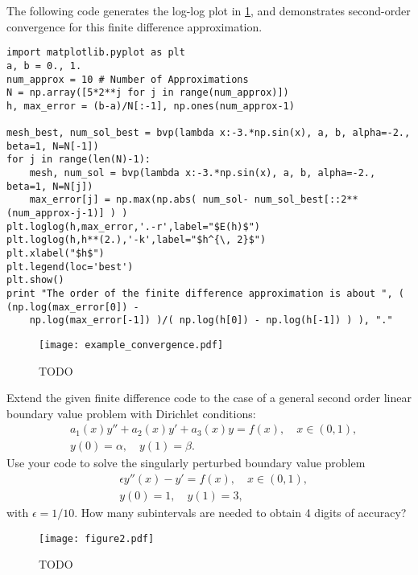 The following code generates the log-log plot in \ref{figure1}, and demonstrates second-order convergence for this finite difference approximation. 
\begin{lstlisting}
import matplotlib.pyplot as plt
a, b = 0., 1.
num_approx = 10 # Number of Approximations
N = np.array([5*2**j for j in range(num_approx)])
h, max_error = (b-a)/N[:-1], np.ones(num_approx-1)

mesh_best, num_sol_best = bvp(lambda x:-3.*np.sin(x), a, b, alpha=-2., beta=1, N=N[-1])
for j in range(len(N)-1): 
    mesh, num_sol = bvp(lambda x:-3.*np.sin(x), a, b, alpha=-2., beta=1, N=N[j])
    max_error[j] = np.max(np.abs( num_sol- num_sol_best[::2**(num_approx-j-1)] ) )
plt.loglog(h,max_error,'.-r',label="$E(h)$")
plt.loglog(h,h**(2.),'-k',label="$h^{\, 2}$")
plt.xlabel("$h$")
plt.legend(loc='best')
plt.show()
print "The order of the finite difference approximation is about ", ( (np.log(max_error[0]) - 
    np.log(max_error[-1]) )/( np.log(h[0]) - np.log(h[-1]) ) ), "."
\end{lstlisting}

\begin{figure}[ht]
\centering
\texttt{[image: example\_convergence.pdf]}
\caption{TODO}
\label{figure1}
\end{figure}


\begin{problem}
Extend the given finite difference code to the case of a general second order linear boundary value problem with Dirichlet conditions:
\begin{align*}
	&{ } a_1(x)y'' +a_2(x)y'+ a_3(x) y = f(x), \quad x \in (0,1),\\
	&{ } y(0) = \alpha, \quad y(1) = \beta.
\end{align*}
Use your code to solve the singularly perturbed boundary value problem
\begin{align*}
	&{ } \epsilon y''(x)-y'= f(x), \quad x \in (0,1), \\
	&{ } y(0) = 1, \quad y(1) = 3,
\end{align*}
with $\epsilon = 1/10$. How many subintervals are needed to obtain 4 digits of accuracy? 

\end{problem}

\begin{figure}[ht]
\centering
\texttt{[image: figure2.pdf]}
\caption{TODO}
\label{figure2}
\end{figure}



